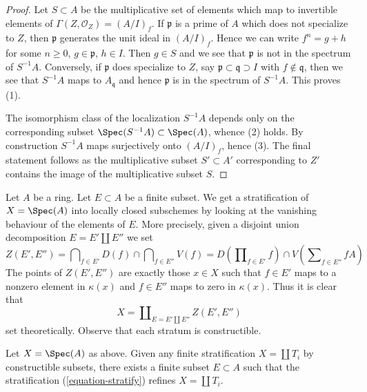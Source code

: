 \begin{proof}
Let $S \subset A$ be the multiplicative set of elements which map
to invertible elements of $\Gamma(Z, \mathcal{O}_Z) = (A/I)_f$.
If $\mathfrak p$ is a prime of $A$ which does not specialize to $Z$,
then $\mathfrak p$ generates the unit ideal in $(A/I)_f$. Hence
we can write $f^n =  g + h$ for some $n \geq 0$, $g \in \mathfrak p$,
$h \in I$. Then $g \in S$ and we see that $\mathfrak p$ is not in
the spectrum of $S^{-1}A$. Conversely, if $\mathfrak p$ does specialize
to $Z$, say $\mathfrak p \subset \mathfrak q \supset I$ with
$f \not \in \mathfrak q$, then we see that $S^{-1}A$ maps to
$A_\mathfrak q$ and hence $\mathfrak p$ is in the spectrum of $S^{-1}A$.
This proves (1).

\medskip\noindent
The isomorphism class of the localization $S^{-1}A$ depends only
on the corresponding subset $\Spec(S^{-1}A) \subset \Spec(A)$, whence
(2) holds. By construction $S^{-1}A$ maps surjectively onto
$(A/I)_f$, hence (3). The final statement follows as the multiplicative subset
$S' \subset A'$ corresponding to $Z'$ contains the image of the
multiplicative subset $S$.
\end{proof}

\noindent
Let $A$ be a ring. Let $E \subset A$ be a finite subset. We get a
stratification of $X = \Spec(A)$ into locally closed subschemes by
looking at the vanishing behaviour of the elements of $E$. More precisely,
given a disjoint union decomposition $E = E' \amalg E''$ we set
\begin{equation}
\label{equation-stratum}
Z(E', E'') =
\bigcap\nolimits_{f \in E'} D(f) \cap \bigcap\nolimits_{f \in E''} V(f) =
D(\prod\nolimits_{f \in E'} f) \cap V( \sum\nolimits_{f \in E''} fA)
\end{equation}
The points of $Z(E', E'')$ are exactly those $x \in X$ such that
$f \in E'$ maps to a nonzero element in $\kappa(x)$ and $f \in E''$
maps to zero in $\kappa(x)$. Thus it is clear that
\begin{equation}
\label{equation-stratify}
X = \coprod\nolimits_{E = E' \amalg E''} Z(E', E'')
\end{equation}
set theoretically. Observe that each stratum is constructible.

\begin{lemma}
\label{lemma-refine}
Let $X = \Spec(A)$ as above. Given any finite stratification
$X = \coprod T_i$ by constructible subsets, there exists a finite
subset $E \subset A$ such that the stratification (\ref{equation-stratify})
refines $X = \coprod T_i$.
\end{lemma}

